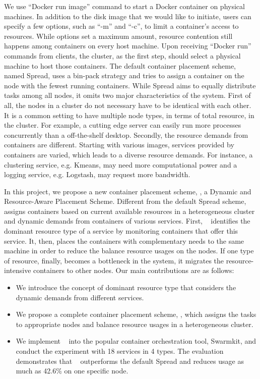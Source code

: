 We use ``Docker run image'' command to start a Docker container on physical machines. 
In addition to the disk image that we would like to
initiate, users can specify a few options, such as ``-m'' and ``-c'', to limit a container's access to resources. 
While options set a maximum amount, resource contention still happens among containers on every host machine.
Upon receiving ``Docker run'' commands from clients, the cluster, as the first step, should select a 
physical machine to host those containers. The default container placement scheme, named Spread, uses a bin-pack strategy and tries to
assign a container on the node with the fewest running containers. 
While Spread aims to equally distribute tasks among all nodes, it omits two major characteristics of the system. First of all,
the nodes in a cluster do not necessary have to be identical with each other. It is a common setting to have multiple node types, 
in terms of total resource, in the cluster. For example, a cutting edge server can easily run more processes concurrently than a off-the-shelf desktop.
Secondly, the resource demands from containers are different. 
Starting with various images, services provided by containers are varied, which leads to a diverse resource demands. 
For instance, a clustering service, e.g. Kmeans, may need more computational power and a logging service, e.g. Logstash, 
may request more bandwidth. 

In this project, we propose a new container placement scheme, \sol, a Dynamic
and Resource-Aware Placement Scheme. Different from the default Spread scheme, \sol~ assigns containers based on current available 
resources in a heterogeneous cluster and dynamic demands from containers of various services. First, \sol~ identifies
the dominant resource type of a service by monitoring containers that offer this service. It, then, places the containers with 
complementary needs to the same machine in order to reduce the balance resource usages on the nodes. 
If one type of resource, finally, becomes a bottleneck in the system, it migrates the resource-intensive containers to other nodes.
Our main contributions are as follows:
\begin{itemize}
 \item We introduce the concept of dominant resource type that considers the dynamic demands from different services.
 \item We propose a complete container placement scheme, \sol, which assigns the tasks to appropriate nodes and balance resource usages
 in a heterogeneous cluster.
 \item We implement \sol~ into the popular container orchestration tool, Swarmkit, and conduct the experiment with 18 services in 4 types.
 The evaluation demonstrates that \sol~ outperforms the default Spread and reduces usage as much as 42.6\% on one specific node.
 
\end{itemize}


